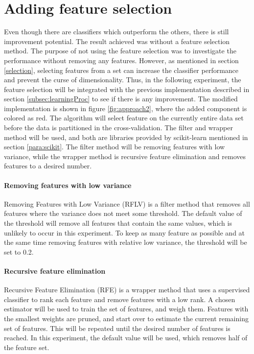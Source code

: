 \documentclass[USenglish]{ifimaster}  %
\begin{document}
\FloatBarrier

	
	
	
\section{Adding feature selection}
Even though there are classifiers which outperform the others, there is still improvement potential. The result achieved was without a feature selection method. The purpose of not using the feature selection was to investigate the performance without removing any features. However, as mentioned in section \ref{selection}, selecting features from a set can increase the classifier performance and prevent the curse of dimensionality. Thus, in the following experiment, the feature selection will be integrated with the previous implementation described in section \ref{subsec:learningProc} to see if there is any improvement. The modified implementation is shown in figure \ref{fig:approach2}, where the added component is colored as red. The algorithm will select feature on the currently entire data set before the data is partitioned in the cross-validation. The filter and wrapper method will be used, and both are libraries provided by scikit-learn mentioned in section \ref{para:scikit}. The filter method will be removing features with low variance, while the wrapper method is recursive feature elimination and removes features to a desired number. 

\paragraph{Removing features with low variance} \label{ap:variance}
Removing Features with Low Variance (RFLV) is a filter method that removes all features where the variance does not meet some threshold. The default value of the threshold will remove all features that contain the same values, which is unlikely to occur in this experiment. To keep as many feature as possible and at the same time removing features with relative low variance, the threshold will be set to 0.2.

\paragraph{Recursive feature elimination} \label{ap:rfe}
Recursive Feature Elimination (RFE) is a wrapper method that uses a supervised classifier to rank each feature and remove features with a low rank. A chosen estimator will be used to train the set of features, and weigh them. Features with the smallest weights are pruned, and start over to estimate the current remaining set of features. This will be repeated until the desired number of features is reached. In this experiment, the default value will be used, which removes half of the feature set.
\end{document}
